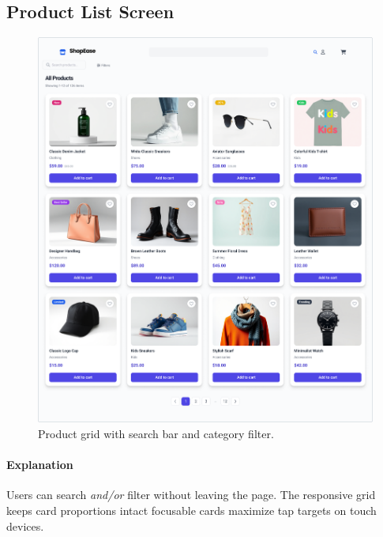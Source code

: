 \documentclass[12pt]{article}
\begin{document}

	\subsection{Product List Screen}\label{subsec:product-list-screen}

	\begin{figure}[H]
		\centering
		\includegraphics[width=\linewidth]{pictures/main/Product_List_Figma}%
		\caption{Product grid with search bar and category filter.}
		\label{fig:ui-products}
	\end{figure}

	\paragraph{Explanation}
	Users can search \emph{and/or} filter without leaving the page.
	The responsive grid keeps card proportions intact focusable
	cards maximize tap targets on touch devices.
\end{document}
